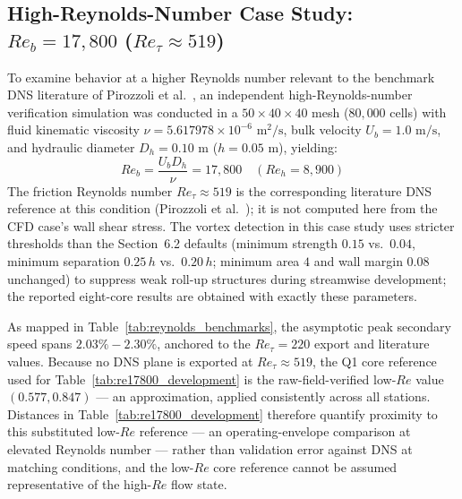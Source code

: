 \documentclass[11pt,a4paper]{article}
\begin{document}
\subsection{High-Reynolds-Number Case Study: \texorpdfstring{$Re_b = 17{,}800$ ($Re_\tau \approx 519$)}{Reb = 17,800 (Re_tau ~ 519)}}
To examine behavior at a higher Reynolds number relevant to the benchmark DNS literature of Pirozzoli et al.~\cite{pirozzoli2018turbulence}, an independent high-Reynolds-number verification simulation was conducted in a $50 \times 40 \times 40$ mesh ($80{,}000$ cells) with fluid kinematic viscosity $\nu = 5.617978 \times 10^{-6}\text{ m}^2/\text{s}$, bulk velocity $U_b = 1.0\text{ m/s}$, and hydraulic diameter $D_h = 0.10\text{ m}$ ($h = 0.05\text{ m}$), yielding:
\begin{equation}
Re_b = \frac{U_b D_h}{\nu} = 17{,}800 \quad (Re_h = 8{,}900)
\end{equation}
The friction Reynolds number $Re_\tau \approx 519$ is the corresponding literature DNS reference at this condition (Pirozzoli et al.~\cite{pirozzoli2018turbulence}); it is not computed here from the CFD case's wall shear stress.
The vortex detection in this case study uses stricter thresholds than the Section~6.2 defaults (minimum strength $0.15$ vs.\ $0.04$, minimum separation $0.25\,h$ vs.\ $0.20\,h$; minimum area $4$ and wall margin $0.08$ unchanged) to suppress weak roll-up structures during streamwise development; the reported eight-core results are obtained with exactly these parameters.

As mapped in Table~\ref{tab:reynolds_benchmarks}, the asymptotic peak secondary speed spans $2.03\% - 2.30\%$, anchored to the $Re_\tau = 220$ export and literature values. Because no DNS plane is exported at $Re_\tau \approx 519$, the Q1 core reference used for Table~\ref{tab:re17800_development} is the raw-field-verified low-$Re$ value $(0.577, 0.847)$ — an approximation, applied consistently across all stations. Distances in Table~\ref{tab:re17800_development} therefore quantify proximity to this substituted low-$Re$ reference — an operating-envelope comparison at elevated Reynolds number — rather than validation error against DNS at matching conditions, and the low-$Re$ core reference cannot be assumed representative of the high-$Re$ flow state.
\end{document}
